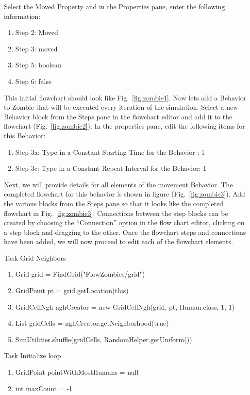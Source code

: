 \documentclass[11pt]{amsart}
\begin{document}
Select the Moved Property and in the Properties pane, enter the following information:

\begin{enumerate}
\item Step 2: Moved
\item Step 3: moved
\item Step 5: boolean
\item Step 6: false
\end{enumerate}

This initial flowchart should look like Fig.~\ref{fig:zombie1}. Now lets add a Behavior to Zombie that will be executed every iteration of the simulation.  Select a new Behavior block from the Steps pane in the flowchart editor and add it to the flowchart (Fig.~\ref{fig:zombie2}).  In the properties pane, edit the following items for this Behavior:

\begin{enumerate}
\item Step 3a: Type in a Constant Starting Time for the Behavior : 1
\item Step 3c: Type in a Constant Repeat Interval for the Behavior: 1
\end{enumerate}

Next, we will provide details for all elements of the movement Behavior.  The completed flowchart for this behavior is shown in figure (Fig.~\ref{fig:zombie3}).  Add the various blocks from the Steps pane so that it looks like the completed flowchart  in Fig.~\ref{fig:zombie3}. Connections between the step blocks can be created by choosing the ``Connection'' option in the flow chart editor, clicking on a step block and dragging to the other. Once the flowchart steps and connections have been added, we will now proceed to edit each of the flowchart elements. 

Task Grid Neighbors
\begin{enumerate}
 \item Grid grid = FindGrid("FlowZombies/grid")
 \item GridPoint pt = grid.getLocation(this)
 \item GridCellNgh nghCreator = new GridCellNgh(grid, pt, Human.class, 1, 1)
 \item List gridCells = nghCreator.getNeighborhood(true)
 \item SimUtilities.shuffle(gridCells, RandomHelper.getUniform())
\end{enumerate}

Task Initialize loop
\begin{enumerate}
 \item GridPoint pointWithMostHumans = null
 \item int maxCount = -1
\end{enumerate}
\end{document}
